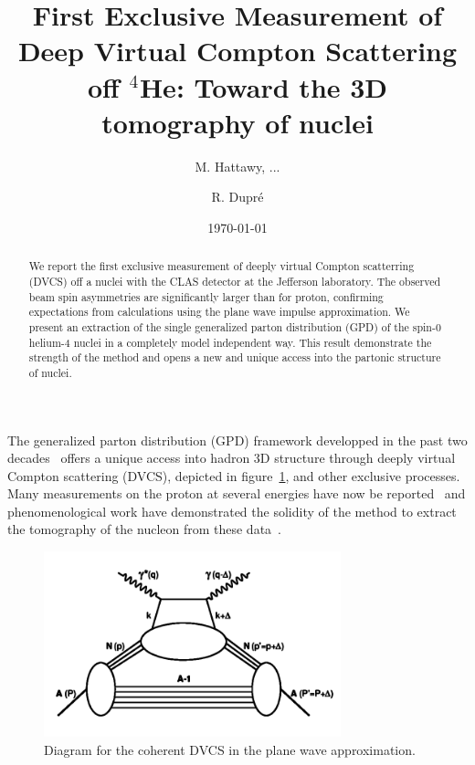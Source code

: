 \documentclass[%
 reprint,
 amsmath,amssymb,
 aps,
]{revtex4-1}
\begin{document}
\title{First Exclusive Measurement of Deep Virtual Compton Scattering off $^4$He: Toward the 3D tomography of nuclei}

\author{M. Hattawy, ...}
\author{R. Dupr\'e}

\date{\today}

\begin{abstract}
We report the first exclusive measurement of deeply virtual Compton scatterring 
(DVCS) off a nuclei with the CLAS detector at the Jefferson laboratory. The 
observed beam spin asymmetries are significantly larger than for proton, 
confirming expectations from calculations using the plane wave impulse 
approximation. We present an 
extraction of the single generalized parton distribution (GPD) of the spin-0 
helium-4 nuclei in a completely model independent way. This result demonstrate the 
strength of the method and opens a new and unique access into the partonic structure 
of nuclei.
\end{abstract}


\maketitle


The generalized parton distribution (GPD) framework developped in the past 
two decades~\cite{}
offers a unique access into hadron 3D structure through deeply virtual Compton
scattering (DVCS), depicted in figure~\ref{fig:DVCS}, and other exclusive 
processes. Many measurements on the proton
at several energies have now be reported~\cite{} and phenomenological work
have demonstrated the solidity of the method to extract the tomography of the
nucleon from these data~\cite{}. 

\begin{figure}[htbp]
\caption{\label{fig:DVCS} Diagram for the coherent DVCS in the plane wave approximation.}
\includegraphics[width=8.6cm]{DVCS.png}
\end{figure}
\end{document}
